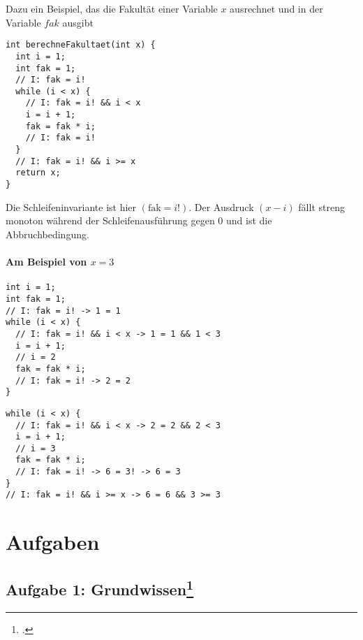 \documentclass{lehramt-informatik-haupt}
\begin{document}
Dazu ein Beispiel, das die Fakultät einer Variable $x$ ausrechnet und in
der Variable $fak$ ausgibt

\begin{verbatim}
int berechneFakultaet(int x) {
  int i = 1;
  int fak = 1;
  // I: fak = i!
  while (i < x) {
    // I: fak = i! && i < x
    i = i + 1;
    fak = fak * i;
    // I: fak = i!
  }
  // I: fak = i! && i >= x
  return x;
}
\end{verbatim}

\noindent
Die Schleifeninvariante ist hier $(\text{fak} = i!)$. Der Ausdruck $(x -
i)$ fällt streng monoton während der Schleifenausführung gegen $0$ und
ist die Abbruchbedingung.

\subsubsection{Am Beispiel von $x = 3$}

\begin{multicols}{2}

\begin{verbatim}
int i = 1;
int fak = 1;
// I: fak = i! -> 1 = 1
while (i < x) {
  // I: fak = i! && i < x -> 1 = 1 && 1 < 3
  i = i + 1;
  // i = 2
  fak = fak * i;
  // I: fak = i! -> 2 = 2
}
\end{verbatim}


\begin{verbatim}
while (i < x) {
  // I: fak = i! && i < x -> 2 = 2 && 2 < 3
  i = i + 1;
  // i = 3
  fak = fak * i;
  // I: fak = i! -> 6 = 3! -> 6 = 3
}
// I: fak = i! && i >= x -> 6 = 6 && 3 >= 3
\end{verbatim}

\end{multicols}


\chapter{Aufgaben}

\section{Aufgabe 1: Grundwissen\footcite[Seite 1]{sosy:ab:8}}
\end{document}
